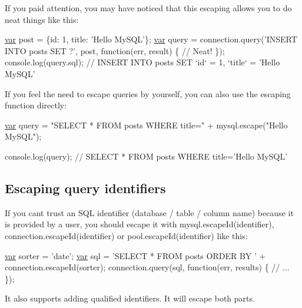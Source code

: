 If you paid attention, you may have noticed that this escaping allows you to do neat things like this\+:


\begin{DoxyCode}
\hyperlink{018__def_8c_a335628f2e9085305224b4f9cc6e95ed5}{var} post  = \{\textcolor{keywordtype}{id}: 1, title: \textcolor{stringliteral}{'Hello MySQL'}\};
\hyperlink{018__def_8c_a335628f2e9085305224b4f9cc6e95ed5}{var} query = connection.query(\textcolor{stringliteral}{'INSERT INTO posts SET ?'}, post, \textcolor{keyword}{function}(err, result) \{
  \textcolor{comment}{// Neat!}
\});
console.log(query.sql); \textcolor{comment}{// INSERT INTO posts SET `id` = 1, `title` = 'Hello MySQL'}
\end{DoxyCode}


If you feel the need to escape queries by yourself, you can also use the escaping function directly\+:


\begin{DoxyCode}
\hyperlink{018__def_8c_a335628f2e9085305224b4f9cc6e95ed5}{var} query = \textcolor{stringliteral}{"SELECT * FROM posts WHERE title="} + mysql.escape(\textcolor{stringliteral}{"Hello MySQL"});

console.log(query); \textcolor{comment}{// SELECT * FROM posts WHERE title='Hello MySQL'}
\end{DoxyCode}


\subsection*{Escaping query identifiers}

If you can\textquotesingle{}t trust an S\+Q\+L identifier (database / table / column name) because it is provided by a user, you should escape it with {\ttfamily mysql.\+escape\+Id(identifier)}, {\ttfamily connection.\+escape\+Id(identifier)} or {\ttfamily pool.\+escape\+Id(identifier)} like this\+:


\begin{DoxyCode}
\hyperlink{018__def_8c_a335628f2e9085305224b4f9cc6e95ed5}{var} sorter = \textcolor{stringliteral}{'date'};
\hyperlink{018__def_8c_a335628f2e9085305224b4f9cc6e95ed5}{var} sql    = \textcolor{stringliteral}{'SELECT * FROM posts ORDER BY '} + connection.escapeId(sorter);
connection.query(sql, \textcolor{keyword}{function}(err, results) \{
  \textcolor{comment}{// ...}
\});
\end{DoxyCode}


It also supports adding qualified identifiers. It will escape both parts.


